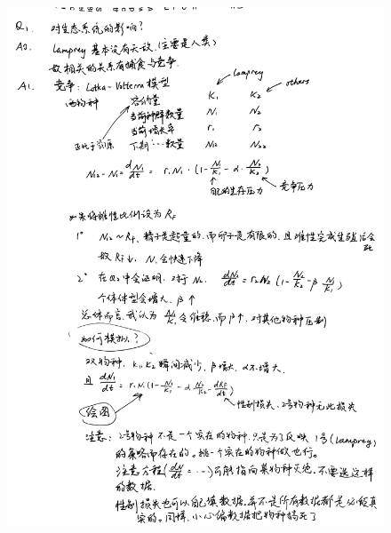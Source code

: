 \documentclass[11pt]{article}
\begin{document}
\begin{figure}[h]
    \includegraphics[height=\textheight]{1.jpg}
\end{figure}
\end{document}
